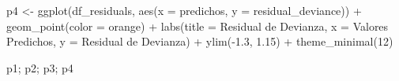 \documentclass[
  letterpaper,
  DIV=11,
  numbers=noendperiod]{scrartcl}
\newenvironment{Shaded}{\begin{snugshade}}{\end{snugshade}}
\newcommand{\AttributeTok}[1]{\textcolor[rgb]{0.40,0.45,0.13}{#1}}
\newcommand{\DecValTok}[1]{\textcolor[rgb]{0.68,0.00,0.00}{#1}}
\newcommand{\FloatTok}[1]{\textcolor[rgb]{0.68,0.00,0.00}{#1}}
\newcommand{\FunctionTok}[1]{\textcolor[rgb]{0.28,0.35,0.67}{#1}}
\newcommand{\NormalTok}[1]{\textcolor[rgb]{0.00,0.23,0.31}{#1}}
\newcommand{\OtherTok}[1]{\textcolor[rgb]{0.00,0.23,0.31}{#1}}
\newcommand{\SpecialCharTok}[1]{\textcolor[rgb]{0.37,0.37,0.37}{#1}}
\newcommand{\StringTok}[1]{\textcolor[rgb]{0.13,0.47,0.30}{#1}}
\begin{document}
\begin{Shaded}
\begin{Highlighting}[]
\NormalTok{p4 }\OtherTok{\textless{}{-}} \FunctionTok{ggplot}\NormalTok{(df\_residuals, }\FunctionTok{aes}\NormalTok{(}\AttributeTok{x =}\NormalTok{ predichos, }\AttributeTok{y =}\NormalTok{ residual\_deviance)) }\SpecialCharTok{+}
    \FunctionTok{geom\_point}\NormalTok{(}\AttributeTok{color =} \StringTok{\textquotesingle{}orange\textquotesingle{}}\NormalTok{) }\SpecialCharTok{+}
    \FunctionTok{labs}\NormalTok{(}\AttributeTok{title =} \StringTok{\textquotesingle{}Residual de Devianza\textquotesingle{}}\NormalTok{, }\AttributeTok{x =} \StringTok{\textquotesingle{}Valores Predichos\textquotesingle{}}\NormalTok{, }\AttributeTok{y =} \StringTok{\textquotesingle{}Residual de Devianza\textquotesingle{}}\NormalTok{) }\SpecialCharTok{+}
    \FunctionTok{ylim}\NormalTok{(}\SpecialCharTok{{-}}\FloatTok{1.3}\NormalTok{, }\FloatTok{1.15}\NormalTok{) }\SpecialCharTok{+}
    \FunctionTok{theme\_minimal}\NormalTok{(}\DecValTok{12}\NormalTok{)}
\end{Highlighting}
\end{Shaded}

\begin{Shaded}
\begin{Highlighting}[]
\NormalTok{p1; p2; p3; p4}
\end{Highlighting}
\end{Shaded}
\end{document}
